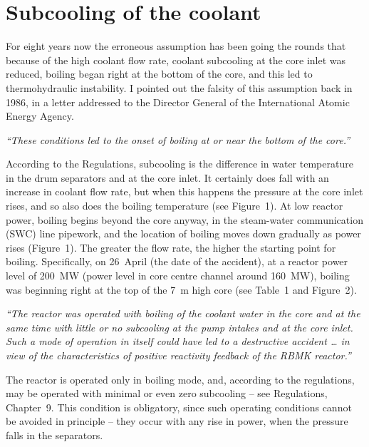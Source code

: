 \documentclass[openright]{bookest}
\begin{document}
\section*{Subcooling of the coolant}

For eight years now the erroneous assumption has been going the rounds that because of the high coolant flow rate, coolant subcooling at the core inlet was reduced, boiling began right at the bottom of the core, and this led to thermohydraulic instability. I pointed out the falsity of this assumption back in 1986, in a letter addressed to the Director General of the International Atomic Energy Agency.

\begin{personal}[INSAG-7 (§2.9):]
\textit{``These conditions led to the onset of boiling at or near the bottom of the core.''}
\end{personal}

According to the Regulations, subcooling is the difference in water temperature in the drum separators and at the core inlet. It certainly does fall with an increase in coolant flow rate, but when this happens the pressure at the core inlet rises, and so also does the boiling temperature (see Figure~1). At low reactor power, boiling begins beyond the core anyway, in the steam-water communication (SWC) line pipework, and the location of boiling moves down gradually as power rises (Figure~1). The greater the flow rate, the higher the starting point for boiling. Specifically, on 26~April (the date of the accident), at a reactor power level of \qty{200}{\mega\watt} (power level in core centre channel around \qty{160}{\mega\watt}), boiling was beginning right at the top of the \qty{7}{\meter} high core (see Table~1 and Figure~2).

\begin{personal}[INSAG-7 (§5.2.3):]
\textit{``The reactor was operated with boiling of the coolant water in the core and at the same time with little or no subcooling at the pump intakes and at the core inlet. Such a mode of operation in itself could have led to a destructive accident \ldots{} in view of the characteristics of positive reactivity feedback of the RBMK reactor.''}
\end{personal}

The reactor is operated only in boiling mode, and, according to the regulations, may be operated with minimal or even zero subcooling -- see Regulations, Chapter~9. This condition is obligatory, since such operating conditions cannot be avoided in principle -- they occur with any rise in power, when the pressure falls in the separators.
\end{document}
